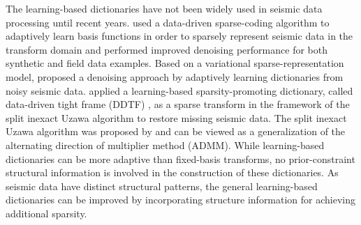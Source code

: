The learning-based dictionaries have not been widely used in seismic data processing until recent years. \cite{kaplan2009} used a data-driven sparse-coding algorithm to adaptively learn basis functions in order to sparsely represent seismic data in the transform domain and performed improved denoising performance for both synthetic and field data examples. Based on a variational sparse-representation model, \cite{jianwei20142} proposed a denoising approach by adaptively learning dictionaries from noisy seismic data.
\cite{jianwei2014} applied a learning-based sparsity-promoting dictionary, called data-driven tight frame (DDTF) \cite[]{jianfeng2013}, as a sparse transform in the framework of the split inexact Uzawa algorithm to restore missing seismic data. The split inexact Uzawa algorithm was proposed by \cite{xiaoqun2011} and can be viewed as a generalization of the alternating direction of multiplier method (ADMM). While learning-based dictionaries can be more adaptive than fixed-basis transforms, no prior-constraint structural information is involved in the construction of these dictionaries. As seismic data have distinct structural patterns, the general learning-based dictionaries can be improved by incorporating structure information for achieving additional sparsity.

